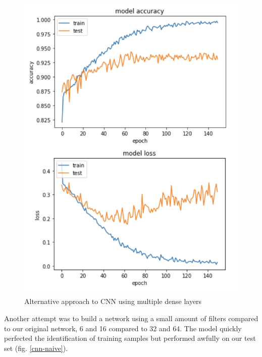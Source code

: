 \begin{figure}[ht]
\begin{center}
\centerline{\includegraphics[width=\columnwidth]{images/cnn-training-second.png}}
\caption{Alternative approach to CNN using multiple dense layers}
\label{cnn-second}
\end{center}
\end{figure}

Another attempt was to build a network using a small amount of filters compared to our original network, 6 and 16 compared to 32 and 64. The model quickly perfected the identification of training samples but performed awfully on our test set (fig. \ref{cnn-naive}).

